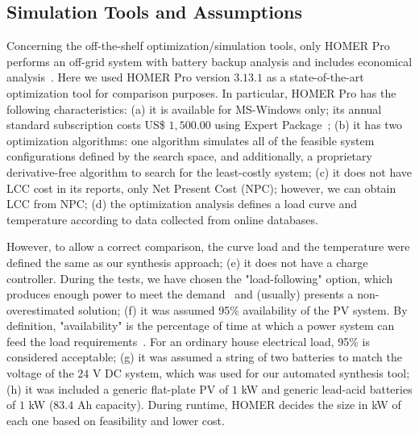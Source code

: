 \documentclass[journal]{IEEEtran}
\begin{document}
\subsection{Simulation Tools and Assumptions}
\label{sec:SimulationToolsandAssumptions}

Concerning the off-the-shelf optimization/simulation tools, only HOMER Pro performs an off-grid system with battery backup analysis and includes economical analysis~\cite{Pradhan,Swarnkar}. Here we used HOMER Pro version $3.13.1$ as a state-of-the-art optimization tool for comparison purposes. In particular, HOMER Pro has the following characteristics:
%
(a) it is available for MS-Windows only; its annual standard subscription costs US\$ $1,500.00$ using Expert Package~\cite{HOMER};
(b) it has two optimization algorithms: one algorithm simulates all of the feasible system configurations defined by the search space, and additionally, a proprietary derivative-free algorithm to search for the least-costly system;
(c) it does not have LCC cost in its reports, only Net Present Cost (NPC); however, we can obtain LCC from NPC; 
(d) the optimization analysis defines a load curve and temperature according to data collected from online databases. 

However, to allow a correct comparison, the curve load and the temperature were defined the same as our synthesis approach; 
(e) it does not have a charge controller. During the tests, we have chosen the "load-following" option, which produces enough power to meet the demand~\cite{HOMER} and (usually) presents a non-overestimated solution; 
(f) it was assumed 95\% availability of the PV system. By definition, "availability" is the percentage of time at which a power system can feed the load requirements~\cite{Khatib2014}. For an ordinary house electrical load, 95\% is considered acceptable;
(g) it was assumed a string of two batteries to match the voltage of the $24$ V DC system, which was used for our automated synthesis tool; 
(h) it was included a generic flat-plate PV of $1$ kW and generic lead-acid batteries of $1$ kW ($83.4$ Ah capacity). During runtime, HOMER decides the size in kW of each one based on feasibility and lower cost.
\end{document}
